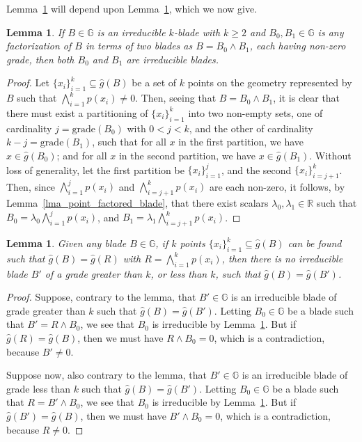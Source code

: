 \documentclass{birkjour}
\newtheorem{lem}[thm]{Lemma}
\theoremstyle{definition}
\theoremstyle{remark}
\numberwithin{equation}{section}
\newcommand{\R}{\mathbb{R}}
\newcommand{\G}{\mathbb{G}}
\newcommand{\gh}{\hat{g}}
\newcommand{\grade}{\mbox{grade}}
\begin{document}
Lemma~\ref{lma_unique_grade_of_irreducible_form} will depend upon
Lemma~\ref{lma_irreducibles_factor_as_irreducibles}, which we now give.

\begin{lem}\label{lma_irreducibles_factor_as_irreducibles}
If $B\in\G$ is an irreducible $k$-blade with $k\geq 2$ and $B_0,B_1\in\G$ is any factorization
of $B$ in terms of two blades as $B=B_0\wedge B_1$, each having non-zero grade,
then both $B_0$ and $B_1$ are irreducible blades.
\end{lem}
\begin{proof}
Let $\{x_i\}_{i=1}^k\subseteq\gh(B)$ be a set of $k$ points on the geometry represented
by $B$ such that $\bigwedge_{i=1}^k p(x_i)\neq 0$.
Then, seeing that $B=B_0\wedge B_1$, it is clear that there must exist a partitioning of
$\{x_i\}_{i=1}^k$ into two non-empty sets, one of cardinality $j=\grade(B_0)$ with $0<j<k$, and
the other of cardinality $k-j=\grade(B_1)$, such that for all $x$ in the first partition, we
have $x\in\gh(B_0)$; and for all $x$ in the second partition, we have $x\in\gh(B_1)$.
Without loss of generality, let the first partition be $\{x_i\}_{i=1}^j$,
and the second $\{x_i\}_{i=j+1}^k$.  Then, since $\bigwedge_{i=1}^j p(x_i)$
and $\bigwedge_{i=j+1}^k p(x_i)$ are each non-zero, it follows, by
Lemma~\ref{lma_point_factored_blade},
that there exist scalars $\lambda_0,\lambda_1\in\R$ such that $B_0=\lambda_0\bigwedge_{i=1}^j p(x_i)$,
and $B_1=\lambda_1\bigwedge_{i=j+1}^k p(x_i)$.
\end{proof}

\begin{lem}\label{lma_unique_grade_of_irreducible_form}
Given any blade $B\in\G$, if $k$ points $\{x_i\}_{i=1}^k\subseteq\gh(B)$ can be found
such that $\gh(B)=\gh(R)$ with $R=\bigwedge_{i=1}^k p(x_i)$, then there is no
irreducible blade $B'$ of a grade greater than $k$, or less than $k$, such that $\gh(B)=\gh(B')$.
\end{lem}
\begin{proof}
Suppose, contrary to the lemma, that $B'\in\G$ is an irreducible blade of grade greater than $k$ such that $\gh(B)=\gh(B')$.
Letting $B_0\in\G$ be a blade such that $B'=R\wedge B_0$, we see that $B_0$ is irreducible
by Lemma~\ref{lma_irreducibles_factor_as_irreducibles}.  But if $\gh(R)=\gh(B)$, then
we must have $R\wedge B_0=0$, which is a contradiction, because $B'\neq 0$.

Suppose now, also contrary to the lemma, that $B'\in\G$ is an irreducible blade of grade less than $k$ such that $\gh(B)=\gh(B')$.
Letting $B_0\in\G$ be a blade such that $R=B'\wedge B_0$, we see that $B_0$ is irreducible
by Lemma~\ref{lma_irreducibles_factor_as_irreducibles}.  But if $\gh(B')=\gh(B)$, then
we must have $B'\wedge B_0=0$, which is a contradiction, because $R\neq 0$.
\end{proof}
\end{document}
